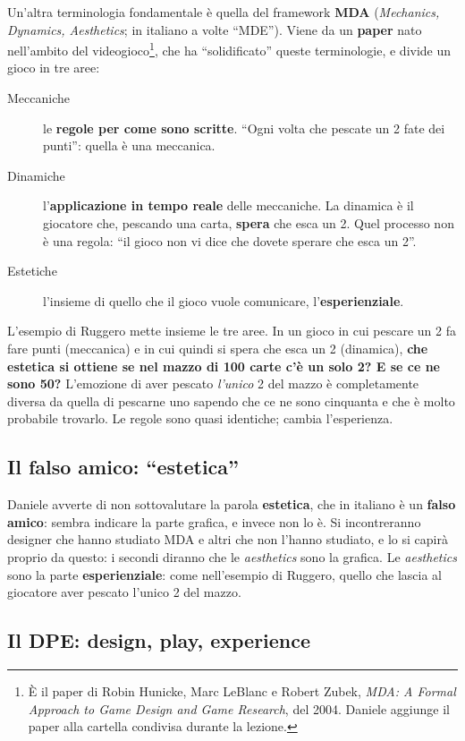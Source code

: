 Un'altra terminologia fondamentale è quella del framework \textbf{MDA}
(\emph{Mechanics, Dynamics, Aesthetics}; in italiano a volte ``MDE''). Viene da
un \textbf{paper} nato nell'ambito del videogioco\footnote{È il paper di Robin
Hunicke, Marc LeBlanc e Robert Zubek, \emph{MDA: A Formal Approach to Game
Design and Game Research}, del 2004. Daniele aggiunge il paper alla cartella
condivisa durante la lezione.}, che ha ``solidificato'' queste terminologie, e
divide un gioco in tre aree:
\begin{description}
  \item[Meccaniche] le \textbf{regole per come sono scritte}. ``Ogni volta che
        pescate un 2 fate dei punti'': quella è una meccanica.
  \item[Dinamiche] l'\textbf{applicazione in tempo reale} delle meccaniche. La
        dinamica è il giocatore che, pescando una carta, \textbf{spera} che esca
        un 2. Quel processo non è una regola: ``il gioco non vi dice che dovete
        sperare che esca un 2''.
  \item[Estetiche] l'insieme di quello che il gioco vuole comunicare,
        l'\textbf{esperienziale}.
\end{description}

L'esempio di Ruggero mette insieme le tre aree. In un gioco in cui pescare un 2
fa fare punti (meccanica) e in cui quindi si spera che esca un 2 (dinamica),
\textbf{che estetica si ottiene se nel mazzo di 100 carte c'è un solo 2? E se ce
ne sono 50?} L'emozione di aver pescato \emph{l'unico} 2 del mazzo è
completamente diversa da quella di pescarne uno sapendo che ce ne sono
cinquanta e che è molto probabile trovarlo. Le regole sono quasi identiche; cambia
l'esperienza.

\subsection{Il falso amico: ``estetica''}

Daniele avverte di non sottovalutare la parola \textbf{estetica}, che in italiano
è un \textbf{falso amico}: sembra indicare la parte grafica, e invece non lo è.
Si incontreranno designer che hanno studiato MDA e altri che non l'hanno
studiato, e lo si capirà proprio da questo: i secondi diranno che le
\emph{aesthetics} sono la grafica. Le \emph{aesthetics} sono la parte
\textbf{esperienziale}: come nell'esempio di Ruggero, quello che lascia al
giocatore aver pescato l'unico 2 del mazzo.

\subsection{Il DPE: design, play, experience}

